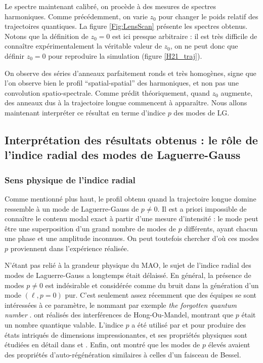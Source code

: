 Le spectre maintenant calibré, on procède à des mesures de spectres harmoniques. Comme précédemment, on varie $z_0$ pour changer le poids relatif des trajectoires quantiques. La figure \ref{Fig:LensScan} présente les spectres obtenus. Notons que la définition de $z_0=0$ est ici presque arbitraire : il est très difficile de connaître expérimentalement la véritable valeur de $z_0$, on ne peut donc que définir $z_0=0$ pour reproduire la simulation (figure \ref{H21_traj}).

On observe des séries d'anneaux parfaitement ronds et très homogènes, signe que l'on observe bien le profil ``spatial-spatial'' des harmoniques, et non pas une convolution spatio-spectrale. Comme prédit théoriquement, quand $z_0$ augmente, des anneaux dus à la trajectoire longue commencent à apparaître. Nous allons maintenant interpréter ce résultat en terme d'indice $p$ des modes de LG.

\subsection{Interprétation des résultats obtenus : le rôle de l'indice radial des modes de Laguerre-Gauss}
\subsubsection{Sens physique de l'indice radial}
Comme mentionné plus haut, le profil obtenu quand la trajectoire longue domine ressemble à un mode de Laguerre-Gauss de $p\neq 0$. Il est a priori impossible de connaître le contenu modal exact à partir d'une mesure d'intensité : le mode peut être une superposition d'un grand nombre de modes de $p$ différents, ayant chacun une phase et une amplitude inconnues. On peut toutefois chercher d'où ces modes $p$ proviennent dans l'expérience réalisée.

N'étant pas relié à la grandeur physique du MAO, le sujet de l'indice radial des modes de Laguerre-Gauss a longtemps était délaissé. En général, la présence de modes $p\neq 0$ est indésirable et considérée comme du bruit dans la génération d'un mode $(\ell,p=0)$ pur. C'est seulement assez récemment que des équipes se sont intéressées à ce paramètre, le nommant par exemple \textit{the forgotten quantum number} .  ont réalisés des interférences de Hong-Ou-Mandel, montrant que $p$ était un nombre quantique valable. L'indice $p$ a été utilisé par  et  pour produire des états intriqués de dimensions impressionantes, et ses propriétés physiques sont étudiées en détail dans  et 	. Enfin,  ont montré que les modes de $p$ élevés avaient des propriétés d'auto-régénération similaires à celles d'un faisceau de Bessel. 

